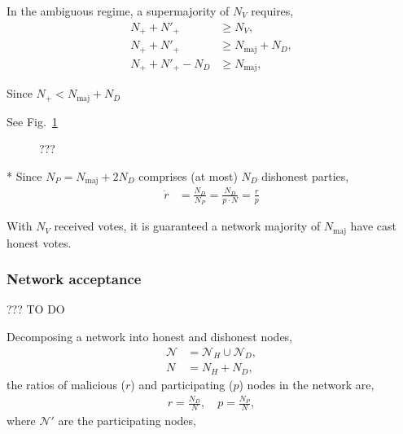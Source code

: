In the ambiguous regime, a supermajority of $N_V$ requires,
\begin{align}
	N_+ + N'_+       & \geq N_V, \nonumber                  \\
	N_+ + N'_+       & \geq N_\mathrm{maj} + N_D, \nonumber \\
	N_+ + N'_+ - N_D & \geq N_\mathrm{maj},
\end{align}

Since $N_+ < N_\mathrm{maj} + N_D$

See Fig.~\ref{fig:voting_pie_chart}

\begin{figure}[!htp]
	\centering
	
	\caption{???} \label{fig:voting_pie_chart}
\end{figure}


* Since $N_P = N_\mathrm{maj} + 2 N_D$ comprises (at most) $N_D$ dishonest parties,
\begin{align}
	\dot{r} & = \frac{N_D}{N_P} = \frac{N_D}{p\cdot N} = \frac{r}{p}
\end{align}


%
%



With $N_V$ received votes, it is guaranteed a network majority of $N_\mathrm{maj}$ have cast honest votes.

\subsubsection{Network acceptance}

??? TO DO


Decomposing a network into honest and dishonest nodes,
\begin{align}
	\mathcal{N} & = \mathcal{N}_H \cup \mathcal{N}_D,\nonumber \\
	N           & = N_H + N_D,
\end{align}
the ratios of malicious ($r$) and participating ($p$) nodes in the network are,
\begin{align}
	r = \frac{N_D}{N},\quad p = \frac{N_P}{N},
\end{align}
where $\mathcal{N}'$ are the participating nodes,


